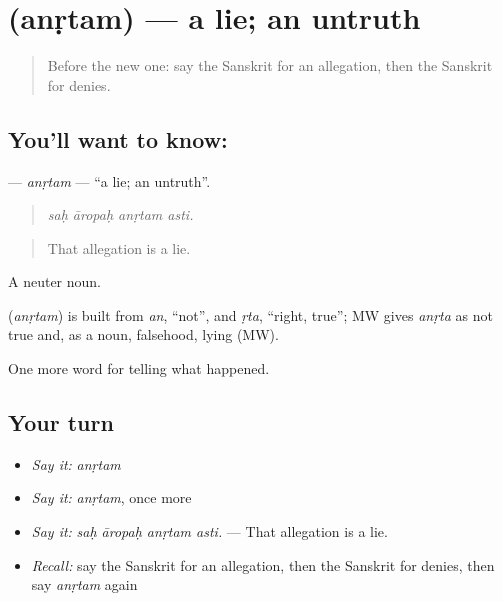 \section[\texorpdfstring{\sk{अनृतम्} (anṛtam)}{अनृतम् (anṛtam)}]{ (anṛtam) — a lie; an untruth}

\label{lesson:SA-C312-anrtam}



\begin{quote}
Before the new one: say the Sanskrit for an allegation, then the Sanskrit for denies.
\end{quote}

\subsection*{You'll want to know: }
\textbf{} — \emph{anṛtam} — \textquotedblleft{}a lie; an untruth\textquotedblright{}.

\begin{quote}
   
\end{quote}

\begin{quote}
\emph{saḥ āropaḥ anṛtam asti.}
\end{quote}

\begin{quote}
That allegation is a lie.
\end{quote}

A neuter noun.

\begin{cousinweb}
\textbf{} (\emph{anṛtam}) is built from \emph{an}, \textquotedblleft{}not\textquotedblright{}, and \emph{ṛta}, \textquotedblleft{}right, true\textquotedblright{}; MW gives \emph{anṛta} as not true and, as a noun, falsehood, lying (MW).
\end{cousinweb}

\begin{grammarlens}[title={What you've built}]
One more word for telling what happened.
\end{grammarlens}

\subsection*{Your turn}
\begin{itemize}
\raggedright
  \item \emph{Say it:} \emph{anṛtam}
  \item \emph{Say it:} \emph{anṛtam}, once more
  \item \emph{Say it:} \emph{saḥ āropaḥ anṛtam asti.} — That allegation is a lie.
  \item \emph{Recall:} say the Sanskrit for an allegation, then the Sanskrit for denies, then say \emph{anṛtam} again
\end{itemize}

